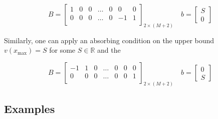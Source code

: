 \documentclass[11pt]{article}
\theoremstyle{definition}
\begin{document}
\begin{equation}\label{eq:absorbing-barrier-matrix}
B = \begin{bmatrix}
1 & 0 & 0 & \dots & 0 & 0 & 0 \\
0 & 0 & 0 & \dots & 0 & -1 & 1\\
\end{bmatrix}_{2 \times (M+2)} \quad 
b = \begin{bmatrix}
S \\
0
\end{bmatrix}
\end{equation}

Similarly, one can apply an absorbing condition on the upper bound  $v(x_{\max}) =S$ for some $S \in \mathbb{R}$ and the 


\begin{equation}\label{eq:absorbing-barrier-matrix-ub}
B = \begin{bmatrix}
-1 & 1 & 0 & \dots & 0 & 0 & 0 \\
0 & 0 & 0 & \dots & 0 & 0 & 1\\
\end{bmatrix}_{2 \times (M+2)} \quad 
b = \begin{bmatrix}
0 \\
S
\end{bmatrix}
\end{equation}


\subsection{Examples}
\end{document}
